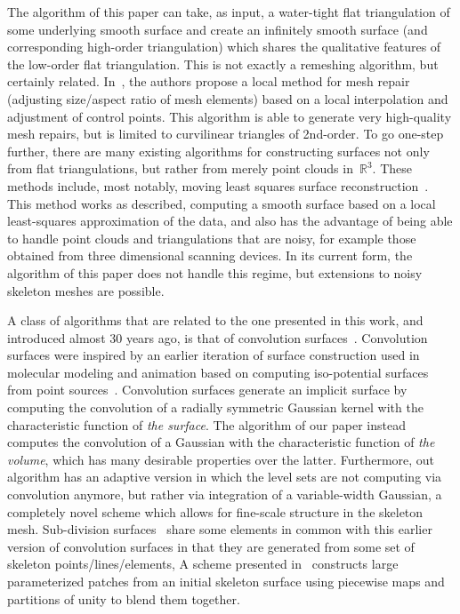 \documentclass[11pt]{article}
\numberwithin{equation}{section}
\newcommand\bbR{\mathbb R}
\begin{document}
The algorithm of this paper can take, as input, a water-tight flat
triangulation of some underlying smooth surface and create an
infinitely smooth surface (and corresponding high-order triangulation)
which shares the qualitative features of the low-order flat
triangulation. This is not exactly a remeshing algorithm, but
certainly related. In~\cite{dapogny2014remesh}, the authors propose a
local method for mesh repair (adjusting size/aspect ratio of mesh
elements) based on a local interpolation and adjustment of control
points. This algorithm is able to generate very high-quality mesh
repairs, but is limited to curvilinear triangles of 2nd-order. To go
one-step further, there are many existing algorithms for constructing
surfaces not only from flat triangulations, but rather from merely
point clouds in~$\bbR^3$.  These methods include, most notably, moving
least squares surface reconstruction~\cite{fleishman2005}. This method
works as described, computing a smooth surface based on a local
least-squares approximation of the data, and also has the advantage of
being able to handle point clouds and triangulations that are noisy,
for example those obtained from three dimensional scanning devices. In
its current form, the algorithm of this paper does not handle this
regime, but extensions to noisy skeleton meshes are possible.

A class of algorithms that are related to the one presented in this
work, and introduced almost 30 years ago, is that of convolution
surfaces~\cite{bloomenthal1991,sherstyuk1999,sherstyuk1999design}.
Convolution surfaces were inspired by an earlier iteration of surface
construction used in molecular modeling and animation based on
computing iso-potential surfaces from point
sources~\cite{blinn1982}. Convolution surfaces generate an implicit
surface by computing the convolution of a radially symmetric Gaussian
kernel with the characteristic function of \emph{the surface}. The
algorithm of our paper instead computes the convolution of a Gaussian
with the characteristic function of \emph{the volume}, which has many
desirable properties over the latter. Furthermore, out algorithm has
an adaptive version in which the level sets are not computing via
convolution anymore, but rather via integration of a variable-width
Gaussian, a completely novel scheme which allows for fine-scale
structure in the skeleton mesh.  Sub-division
surfaces~\cite{derose1998subdivision,zorin1996interpolating} share
some elements in common with this earlier version of convolution
surfaces in that they are generated from some set of skeleton
points/lines/elements, A scheme presented in~\cite{ying2004simple}
constructs large parameterized patches from an initial skeleton
surface using piecewise maps and partitions of unity to blend them
together.
\end{document}
